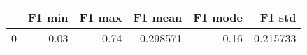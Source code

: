 \begin{tabular}{lrrrrr}
\toprule
{} &  F1 min &  F1 max &   F1 mean &  F1 mode &    F1 std \\
\midrule
0 &    0.03 &    0.74 &  0.298571 &     0.16 &  0.215733 \\
\bottomrule
\end{tabular}
